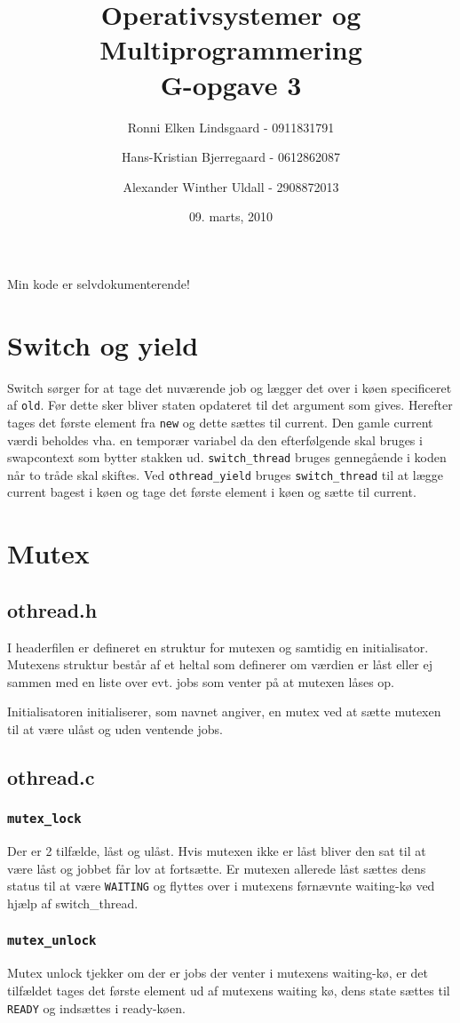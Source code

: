 \documentclass[titlepage]{article}
\title{Operativsystemer og Multiprogrammering\\G-opgave 3}
\author{Ronni Elken Lindsgaard - 0911831791 \and
Hans-Kristian Bjerregaard - 0612862087 \and
Alexander Winther Uldall - 2908872013}
\date{09. marts, 2010}
\begin{document}
\maketitle
\newpage
Min kode er selvdokumenterende!
\section{Switch og yield}
Switch sørger for at tage det nuværende job og lægger det over i køen specificeret af {\tt old}. Før
dette sker bliver staten opdateret til det argument som gives. Herefter tages det første element fra 
{\tt new} og dette sættes til current. Den gamle current værdi beholdes vha. en temporær variabel da
den efterfølgende skal bruges i swapcontext som bytter stakken ud.
{\tt switch\_thread} bruges gennegående i koden når to tråde skal skiftes. Ved {\tt othread\_yield}
bruges {\tt switch\_thread} til at lægge current bagest i køen og tage det første element i køen og
sætte til current. 
\section{Mutex}
\subsection{othread.h}
I headerfilen er defineret en struktur for mutexen og samtidig en initialisator. Mutexens struktur
består af et heltal som definerer om værdien er låst eller ej sammen med en liste over evt. jobs som
venter på at mutexen låses op.

Initialisatoren initialiserer, som navnet angiver, en mutex ved at sætte mutexen til at være ulåst
og uden ventende jobs.
\subsection{othread.c}
\subsubsection{\tt mutex\_lock}
Der er 2 tilfælde, låst og ulåst. Hvis mutexen ikke er låst bliver den sat til at være låst og
jobbet får lov at fortsætte.
Er mutexen allerede låst sættes dens status til at være {\tt WAITING} og flyttes over i mutexens
førnævnte waiting-kø ved hjælp af switch\_thread.
\subsubsection{\tt mutex\_unlock}
Mutex unlock tjekker om der er jobs der venter i mutexens waiting-kø, er det tilfældet tages det
første element ud af mutexens waiting kø, dens state sættes til {\tt READY} og indsættes i
ready-køen.
\end{document}
